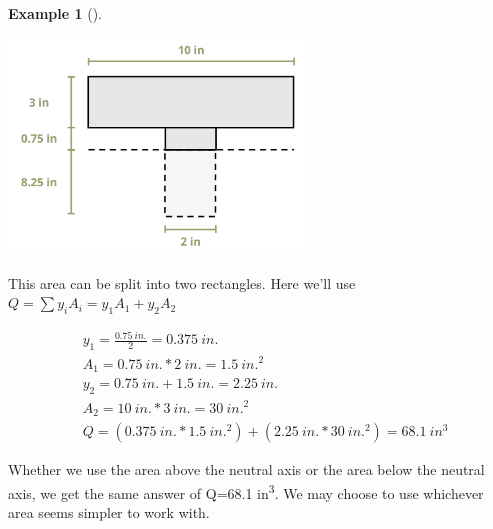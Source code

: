 \documentclass[
  letterpaper,
  DIV=11,
  numbers=noendperiod]{scrreprt}
\theoremstyle{definition}
\newtheorem{example}{Example}[chapter]
\theoremstyle{remark}
\begin{document}
\begin{tcolorbox}
\begin{example}[]
\begin{tcolorbox}
\begin{center}
\includegraphics[width=3.14583in,height=\textheight]{images/CH10 PNGs/example 10.1 part 4.png}
\end{center}

This area can be split into two rectangles. Here we'll use
\(Q=\sum y_i A_i=y_1 A_1+y_2 A_2\)

\[
\begin{aligned}
& y_1=\frac{0.75{~in.}}{2}=0.375{~in.} \\
& A_1=0.75{~in.} * 2{~in.}=1.5{~in.}^2 \\
& y_2=0.75{~in.}+1.5{~in.}=2.25{~in.} \\
& A_2=10{~in.} * 3{~in.}=30{~in.}^2 \\
& Q=(0.375{~in.} * 1.5{~in.}^2)+(2.25{~in.} * 30{~in.}^2)=68.1{~in}^3
\end{aligned}
\]

Whether we use the area above the neutral axis or the area below the
neutral axis, we get the same answer of Q=68.1 in\textsuperscript{3}. We
may choose to use whichever area seems simpler to work with.

\end{tcolorbox}

\end{example}

\end{tcolorbox}
\end{document}
